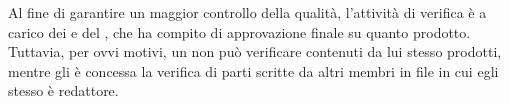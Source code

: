 Al fine di garantire un maggior controllo della qualità, l'attività di verifica è a carico dei \vers \space e del \Res , che ha compito di approvazione finale su quanto prodotto. Tuttavia, per ovvi motivi, un \ver \space non può verificare contenuti da lui stesso prodotti, mentre gli è concessa la verifica di parti scritte da altri membri in file in cui egli stesso è redattore.